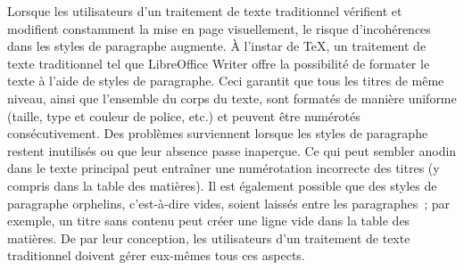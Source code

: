 \documentclass[11pt,a4paper,ngerman,french,DIV=8]{scrartcl}
\begin{document}
Lorsque les utilisateurs d'un traitement de texte traditionnel vérifient et modifient constamment la mise en page visuellement, le risque d'incohérences dans les styles de paragraphe augmente. À l'instar de \TeX{}, un traitement de texte traditionnel tel que LibreOffice Writer offre la possibilité de formater le texte à l'aide de styles de paragraphe. Ceci garantit que tous les titres de même niveau, ainsi que l'ensemble du corps du texte, sont formatés de manière uniforme (taille, type et couleur de police, etc.) et peuvent être numérotés consécutivement. Des problèmes surviennent lorsque les styles de paragraphe restent inutilisés ou que leur absence passe inaperçue. Ce qui peut sembler anodin dans le texte principal peut entraîner une numérotation incorrecte des titres (y compris dans la table des matières). Il est également possible que des styles de paragraphe orphelins, c'est-à-dire vides, soient laissés entre les paragraphes ; par exemple, un titre sans contenu peut créer une ligne vide dans la table des matières. De par leur conception, les utilisateurs d'un traitement de texte traditionnel doivent gérer eux-mêmes tous ces aspects\footnotemark{}.

\end{document}
